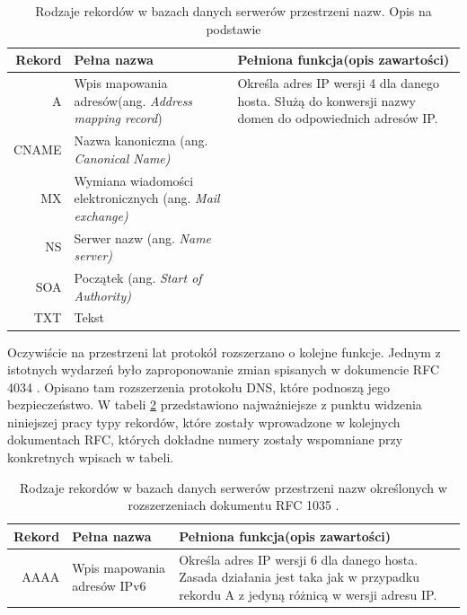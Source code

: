 \begin{table}[]
	\centering
	\caption{Rodzaje rekordów w bazach danych serwerów przestrzeni nazw. Opis na podstawie \cite{}}
	\label{typyRekordowDns}
	\begin{tabular}{|r|p{3cm}|p{8cm}|}
		\hline
			\textbf{Rekord} &
			\textbf{Pełna nazwa} &
			\textbf{Pełniona funkcja(opis zawartości)} \\
		\hline\hline
			A &
			Wpis mapowania adresów(ang. \textit{Address mapping record}) &
			Określa adres IP wersji 4 dla danego hosta. Służą do konwersji nazwy domen do odpowiednich adresów IP.\\
		\hline
			CNAME &
			Nazwa kanoniczna (ang. \textit{Canonical Name)} &
			\\
		\hline
			MX &
			Wymiana wiadomości elektronicznych (ang. \textit{Mail exchange)} &
			\\
		\hline
			NS &
			Serwer nazw (ang. \textit{Name server)} &
			\\
		\hline
			SOA &
			Początek (ang. \textit{Start of Authority)} &
			\\
		\hline
			TXT &
			Tekst &
		\\
		\hline

	\end{tabular}
\end{table}

Oczywiście na przestrzeni lat protokół rozszerzano o kolejne funkcje. Jednym z istotnych wydarzeń było zaproponowanie zmian spisanych w dokumencie RFC 4034 \cite{RFC4034}. Opisano tam rozszerzenia protokołu DNS, które podnoszą jego bezpieczeństwo. W tabeli \ref{typyRekordowDnsExt} przedstawiono najważniejsze z punktu widzenia niniejszej pracy typy rekordów, które zostały wprowadzone w kolejnych dokumentach RFC, których dokładne numery zostały wspomniane przy konkretnych wpisach w tabeli.

\begin{table}[]
	\centering
	\caption{Rodzaje rekordów w bazach danych serwerów przestrzeni nazw określonych w rozszerzeniach dokumentu RFC 1035 \cite{}.}
	\label{typyRekordowDnsExt}
	\begin{tabular}{|r|p{3cm}|p{8cm}|}
		\hline
		\textbf{Rekord} &
		\textbf{Pełna nazwa} &
		\textbf{Pełniona funkcja(opis zawartości)} \\
		\hline\hline
			AAAA &
			Wpis mapowania adresów IPv6 &
			Określa adres IP wersji 6 dla danego hosta. Zasada działania jest taka jak w przypadku rekordu A z jedyną różnicą w wersji adresu IP. \\
		\hline
	\end{tabular}
\end{table}

